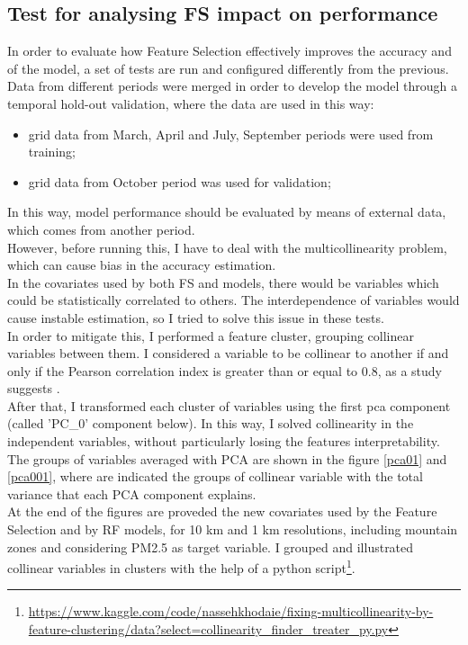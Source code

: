 \subsection{Test for analysing FS impact on performance}
In order to evaluate how Feature Selection effectively improves the accuracy and of the model, a set of tests are run and configured differently from the previous.\\ 
Data from different periods were merged in order to develop the model through a temporal hold-out validation, where the data are used in this way:
\begin{itemize}
    \item grid data from March, April and July, September periods were used from training;
    \item grid data from October period was used for validation;
\end{itemize}
In this way, model performance should be evaluated by means of external data, which comes from another period.\\
However, before running this, I have to deal with the multicollinearity problem, which can cause bias in the accuracy estimation.\\ 
In the covariates used by both FS and models, there would be variables which could be statistically correlated to others. 
The interdependence of variables would cause instable estimation, so I tried to solve this issue in these tests.\\ 
In order to mitigate this, I performed a feature cluster, grouping collinear variables between them. I considered a variable to be collinear to another if and only if the Pearson correlation index is greater than or equal to 0.8, as a study suggests \cite{shrestha2020detecting}. \\
After that, I transformed each cluster of variables using the first \gls{pca} component (called 'PC\_0' component below). In this way, I solved collinearity in the independent variables, without particularly losing the features interpretability.\\
The groups of variables averaged with PCA are shown in the figure \ref{pca01} and \ref{pca001}, where are indicated the groups of collinear variable with the total variance that each PCA component explains. \\
At the end of the figures are proveded the new covariates used by the Feature Selection and by RF models, for 10 km and 1 km resolutions, including mountain zones and considering PM2.5 as target variable.
I grouped and illustrated collinear variables in clusters with the help of a python script\footnote{\url{https://www.kaggle.com/code/nassehkhodaie/fixing-multicollinearity-by-feature-clustering/data?select=collinearity_finder_treater_py.py}}.
